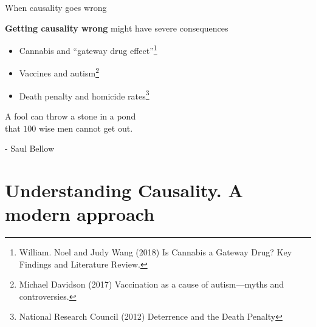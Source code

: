 \documentclass[aspectratio=169]{beamer}
\begin{document}
\begin{frame}{When causality goes wrong}

    \textbf{Getting causality wrong} might have severe consequences
    \begin{itemize}
        \item Cannabis and ``gateway drug effect''\footnote{\scriptsize William. Noel and Judy Wang (2018) Is Cannabis a Gateway Drug? Key Findings and Literature Review.}
        \item Vaccines and autism\footnote{\scriptsize Michael Davidson (2017) Vaccination as a cause of autism—myths and controversies.}
        \item Death penalty and homicide rates\footnote{\scriptsize National Research Council (2012) Deterrence and the Death Penalty}
    \end{itemize}
    \vspace{0.35cm}
\begin{center}
\begin{tcolorbox}[enhanced,sharp corners,
    width=6.8cm,
    colback=white,
    overlay={
        \node[anchor=north west,fill=white,draw=white,circle,inner sep=1pt] 
        at ([xshift=-0.17cm,yshift=0.2cm]frame.north west) {\faQuoteLeft};
        \node[anchor=south east,fill=white,draw=white,circle,inner sep=1pt] 
        at ([xshift=0.17cm,yshift=-0.2cm]frame.south east) {\faQuoteRight};
    }
    ]
    A fool can throw a stone in a pond \\
    that $100$ wise men cannot get out. \\
    \vspace{0cm}

    {\small - Saul Bellow}
\end{tcolorbox}
\end{center}
    
\end{frame}

\section{\Large{Understanding Causality. A modern approach}}
\end{document}
